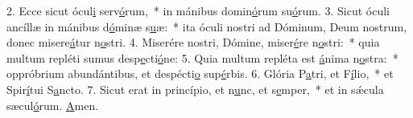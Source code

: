 2. Ecce sicut ócul\uline{i} serv\uline{ó}rum,~* in mánibus domin\uline{ó}rum su\uline{ó}rum.
3. Sicut óculi ancíllæ in mánibus d\uline{ó}minæ s\uline{u}æ:~* ita óculi nostri ad Dóminum, Deum nostrum, donec misere\uline{á}tur n\uline{o}stri.
4. Miserére nostri, Dómine, miser\uline{é}re n\uline{o}stri:~* quia multum repléti sumus desp\uline{e}cti\uline{ó}ne:
5. Quia multum repléta est \uline{á}nima n\uline{o}stra:~* oppróbrium abundántibus, et despécti\uline{o} sup\uline{é}rbis.
6. Glória P\uline{a}tri, et F\uline{í}lio,~* et Spir\uline{í}tui S\uline{a}ncto.
7. Sicut erat in princípio, et n\uline{u}nc, et s\uline{e}mper,~* et in sǽcula sæcul\uline{ó}rum. \uline{A}men.
